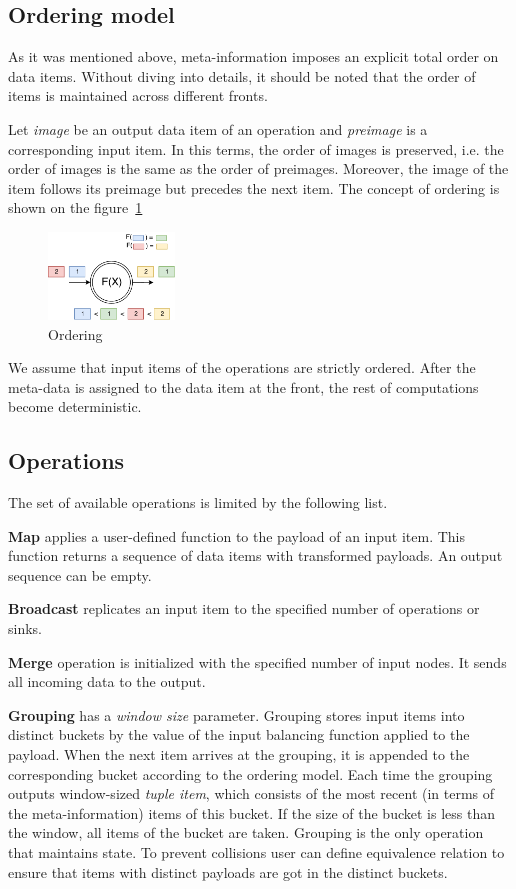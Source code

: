 \subsection{Ordering model}

As it was mentioned above, meta-information imposes an explicit total order on data items. Without diving into details, it should be noted that the order of items is maintained across different fronts.

Let {\it image} be an output data item of an operation and {\it preimage} is a corresponding input item. In this terms, the order of images is preserved, i.e. the order of images is the same as the order of preimages. Moreover, the image of the item follows its preimage but precedes the next item. The concept of ordering is shown on the figure~\ref{ordering}

\begin{figure}[htbp]
  \centering
  \includegraphics[width=0.30\textwidth]{pics/ordering}
  \caption{Ordering}
  \label {ordering}
\end{figure}

We assume that input items of the operations are strictly ordered. After the meta-data is assigned to the data item at the front, the rest of computations become deterministic.

\subsection{Operations}

The set of available operations is limited by the following list.

{\bf Map} applies a user-defined function to the payload of an input item. This function returns a sequence of data items with transformed payloads. An output sequence can be empty.

{\bf Broadcast} replicates an input item to the specified number of operations or sinks.

{\bf Merge} operation is initialized with the specified number of input nodes. It sends all incoming data to the output.

{\bf Grouping} has a {\it window size} parameter. Grouping stores input items into distinct buckets by the value of the input balancing function applied to the payload. When the next item arrives at the grouping, it is appended to the corresponding bucket according to the ordering model. Each time the grouping outputs window-sized {\it tuple item}, which consists of the most recent (in terms of the meta-information) items of this bucket. If the size of the bucket is less than the window, all items of the bucket are taken. Grouping is the only operation that maintains state. To prevent collisions user can define equivalence relation to ensure that items with distinct payloads are got in the distinct buckets.

